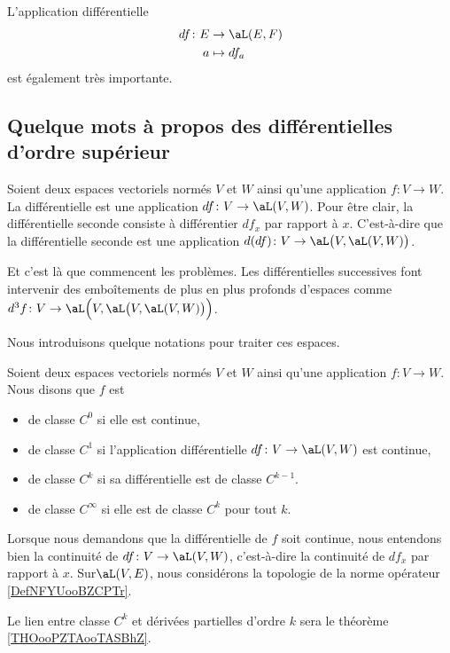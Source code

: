 L'application différentielle
\begin{equation}
	\begin{aligned}
		df\colon E & \to \aL(E,F) \\
		a          & \mapsto df_a
	\end{aligned}
\end{equation}
est également très importante.


\subsection{Quelque mots à propos des différentielles d'ordre supérieur}

Soient deux espaces vectoriels normés \( V\) et \( W\) ainsi qu'une application \( f\colon V\to W\). La différentielle est une application \( df\colon V\to \aL(V,W)\). Pour être clair, la différentielle seconde consiste à différentier \( df_x\) par rapport à \( x\). C'est-à-dire que la différentielle seconde est une application \( d(df)\colon V\to \aL\big( V,\aL(V,W) \big)\).

Et c'est là que commencent les problèmes. Les différentielles successives font intervenir des emboîtements de plus en plus profonds d'espaces comme \( d^3f\colon V\to \aL\Big( V,\aL\big( V,\aL(V,W) \big) \Big)\).

Nous introduisons quelque notations pour traiter ces espaces.

\begin{definition}  \label{DefPNjMGqy}
	Soient deux espaces vectoriels normés \( V\) et \( W\) ainsi qu'une application \( f\colon V\to W\). Nous disons que \( f\) est
	\begin{itemize}
		\item de classe  \( C^0\) si elle est continue,
		\item de classe \( C^1\) si l'application différentielle \( df\colon V\to \aL(V,W)\) est continue,
		\item de classe \( C^k\) si sa différentielle est de classe \( C^{k-1}\).
		\item de classe \( C^{\infty}\) si elle est de classe \( C^k\) pour tout \( k\).
	\end{itemize}

	Lorsque nous demandons que la différentielle de \( f\) soit continue, nous entendons bien la continuité de \( df\colon V\to \aL(V,W)\), c'est-à-dire la continuité de \( df_x\) par rapport à \( x\). Sur\( \aL(V,E)\), nous considérons la topologie de la norme opérateur \ref{DefNFYUooBZCPTr}.

\end{definition}
Le lien entre classe \( C^k\) et dérivées partielles d'ordre \( k\) sera le théorème \ref{THOooPZTAooTASBhZ}.

